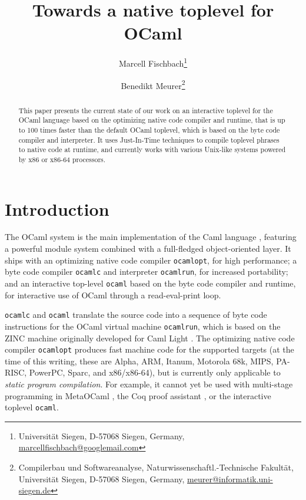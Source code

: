 \documentclass[10pt,a4paper,draft,twocolumn]{article}
\begin{document}
\title{%
  Towards a native toplevel for OCaml
}
\author{%
  Marcell Fischbach\thanks{
    Universit\"at Siegen,
    D-57068 Siegen,
    Germany,
    \url{marcellfischbach@googlemail.com}
  }
  \and
  Benedikt Meurer\thanks{
    Compilerbau und Softwareanalyse,
    Naturwissenschaftl.-Technische Fakult\"at,
    Universit\"at Siegen,
    D-57068 Siegen,
    Germany,
    \url{meurer@informatik.uni-siegen.de}
  }
}
\date{}

\maketitle

\begin{abstract}
  This paper presents the current state of our work on an interactive toplevel for the OCaml language
  based on the optimizing native code compiler and runtime, that is up to 100 times faster
  than the default OCaml toplevel, which is based on the byte code compiler and interpreter.
  It uses Just-In-Time techniques to compile toplevel phrases to native code at runtime, and
  currently works with various Unix-like systems powered by x86 or x86-64 processors.
\end{abstract}


\section{Introduction}

The OCaml \cite{Leroy11,Remy02} system is the main implementation of the Caml
language \cite{Caml11}, featuring a powerful module system
combined with a full-fledged object-oriented layer. It ships with an optimizing native
code compiler \texttt{ocamlopt}, for high performance; a byte code compiler \texttt{ocamlc}
and interpreter \texttt{ocamlrun}, for increased portability; and an interactive top-level
\texttt{ocaml} based on the byte code compiler and runtime, for interactive use of OCaml
through a read-eval-print loop.

\texttt{ocamlc} and \texttt{ocaml} translate the source code into a sequence of byte code
instructions for the OCaml virtual machine \texttt{ocamlrun}, which is based on the ZINC
machine \cite{Leroy90} originally developed for Caml Light \cite{Leroy02}. The optimizing
native code compiler \texttt{ocamlopt} produces fast machine code for the supported targets
(at the time of this writing, these are Alpha, ARM, Itanum, Motorola 68k, MIPS, PA-RISC, PowerPC,
Sparc, and x86/x86-64), but is currently only applicable to \emph{static program compilation}.
For example, it cannot yet be used with multi-stage programming in MetaOCaml \cite{Taha03,Taha06},
the Coq proof assistant \cite{Bertot04,Coq10}, or the interactive toplevel \texttt{ocaml}.
\end{document}
